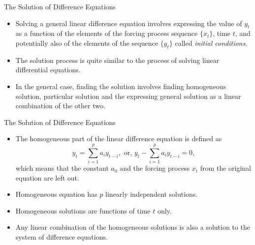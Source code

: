 \documentclass{beamer}
\begin{document}
\begin{frame}{The Solution of Difference Equations}
   \begin{itemize}
       \item Solving a general linear difference equation involves expressing the value of $y_t$ as a function of the elements of the forcing process sequence $\{x_t \}$, time $t$, and potentially also of the elements of the sequence $\{y_t\}$ called \textit{initial conditions}.
       \item The solution process is quite similar to the process of solving linear differential equations. 
       \item In the general case, finding the solution involves finding homogeneous solution, particular solution and the expressing general solution as a linear combination of the other two. 
   \end{itemize} 
  \end{frame}

\begin{frame}{The Solution of Difference Equations}
\begin{itemize}
    \item The homogeneous part of the linear difference equation is defined as
    \[y_t=\sum_{i=1}^pa_iy_{t-i}, \text{ or, }y_t-\sum_{i=1}^pa_iy_{t-i}=0,
    \]
    which means that the constant $a_0$ and the forcing process $x_t$ from the original equation are left out. 
    \item Homogeneous equation has $p$ linearly independent solutions. 
    \item Homogeneous solutions are functions of time $t$ only. 
    \item Any linear combination of the homogeneous solutions is also a solution to the system of difference equations.
\end{itemize}
  \end{frame}
\end{document}
